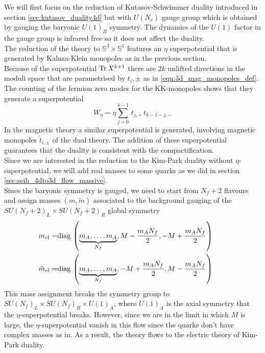 We will first focus on the reduction of Kutasov-Schwimmer duality introduced in section \ref{sec:kutasov_duality4d} but with $U(N_c)$ gauge group which is obtained by gauging the baryonic $U(1)_B$ symmetry.
The dynamics of the $U(1)$ factor in the gauge group is infrared free so it does not affect the duality.\\
The reduction of the theory to $\mathbb{S}^3 \times \mathbb{S}^1$ features an $\eta$ superpotential that is generated by Kaluza-Klein monopoles as in the previous section.\\
Because of the superpotential $\mathrm{Tr } \,{X^{k+1}} $ there are $2k $ unlifted directions in the moduli space that are parametrised by $t_i,\pm$ as in \eqref{eqn:3d_mag_monopoles_def}. 
The counting of the fermion zero modes for the KK-monopoles shows that they generate a superpotential \cite{Nii:2014jsa}
\begin{equation}
W_{\eta} = \eta \sum_{j=0}^{k-1} \, t_{j,+} \, t_{k-1-j,-} 
\end{equation}
In the magnetic theory a similar superpotential is generated, involving magnetic monopoles $\tilde{t}_{i,\pm}$ of the dual theory.
The addition of these superpotential guarantees that the duality is consistent with the compactification.\\
Since we are interested in the reduction to the Kim-Park duality without $\eta$-superpotential, we will add real masses to some quarks as we did in section \ref{sec:seib_4dto3d_flow_massive}.\\
Since the baryonic symmetry is gauged, we need to start from $N_f +2 $ flavours and assign masses $(m,\tilde{m})$ associated to the background gauging of the $SU(N_f+2)_L \times SU(N_f +2 )_R$ global symmetry
\begin{align}
 m_{el} = & \hbox{diag\,} \left( \underbrace{m_A,\dotsc,m_A}_{N_f}, M - \frac{m_A N_f}{2},-M +\frac{m_A N_f}{2}\right) \qquad \\
 \tilde{m}_{el} = & \hbox{diag\,} \left( 
 \underbrace{
 m_A , \dotsc, m_A
 }_{N_f}
 ,-M +\frac{m_A N_f}{2}, M - \frac{m_A N_f}{2} \right)
\end{align}
This mass assignment breaks the symmetry group to $SU(N_f)_L \times SU(N_f)_R \times U(1)_A $, where $U(1)_A$ is the axial symmetry that the $\eta$-superpotential breaks. 
However, since we are in the limit in which $M $ is large, the $\eta$-superpotential vanish in this flow since the quarks don't have complex masses as in\cite{Aharony:2013dha}.
As a result, the theory flows to the electric theory of Kim-Park duality.\\
